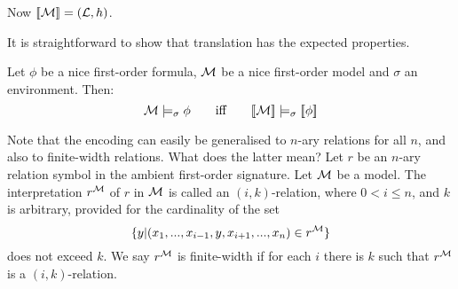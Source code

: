 \NI Now $\lbrack\!\lbrack \mathcal{M} \rbrack\!\rbrack = (\mathcal{L}, h)$.

It is straightforward to show that translation has the expected 
properties.

\begin{theorem}
Let $\phi$ be a nice first-order formula, $\mathcal{M}$ be a nice
first-order model and $\sigma$ an environment. Then:
\[
   \mathcal{M} \models_{\sigma} \phi
      \qquad\text{iff}\qquad
   \lbrack\!\lbrack \mathcal{M} \rbrack\!\rbrack \models_{\sigma} \lbrack\!\lbrack \phi \rbrack\!\rbrack
\]
\end{theorem}

\NI Note that the encoding can easily be generalised to $n$-ary
relations for all $n$, and also to finite-width relations.  What does
the latter mean? Let $r$ be an $n$-ary relation symbol in the ambient
first-order signature. Let $\mathcal{M}$ be a model. The interpretation
$r^{\mathcal{M}}$ of $r$ in $\mathcal{M}$ is called an $(i, k)$-relation,
where $0 < i \leq n$, and $k$ is arbitrary, provided for the
cardinality of the set
\[
   \{ y | (x_1, ..., x_{i-1}, y, x_{i+1}, ..., x_{n}) \in r^{\mathcal{M}} \}
\]
does not exceed $k$. We say $r^{\mathcal{M}}$ is finite-width if for each
$i$ there is $k$ such that $r^{\mathcal{M}}$ is a $(i, k)$-relation.

